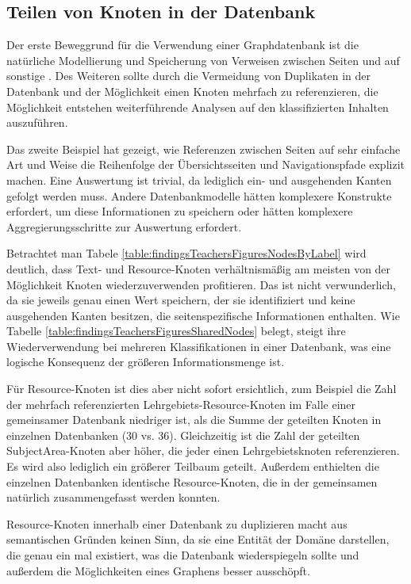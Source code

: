 \subsection{Teilen von Knoten in der Datenbank}
    Der erste Beweggrund für die Verwendung einer Graphdatenbank
    ist die natürliche Modellierung und Speicherung von Verweisen
    zwischen Seiten und auf sonstige {\resources}.
    Des Weiteren sollte durch die Vermeidung von Duplikaten in der Datenbank
    und der Möglichkeit einen Knoten mehrfach zu referenzieren,
    die Möglichkeit entstehen weiterführende Analysen auf den klassifizierten
    Inhalten auszuführen.

    Das zweite Beispiel hat gezeigt,
    wie Referenzen zwischen Seiten auf sehr einfache Art und Weise
    die Reihenfolge der Übersichtsseiten und Navigationspfade explizit machen.
    Eine Auswertung ist trivial, da lediglich ein- und ausgehenden Kanten gefolgt werden muss.
    Andere Datenbankmodelle hätten komplexere Konstrukte erfordert,
    um diese Informationen zu speichern oder hätten komplexere
    Aggregierungsschritte zur Auswertung erfordert.

    Betrachtet man Tabele \ref{table:findingsTeachersFiguresNodesByLabel} wird deutlich,
    dass Text- und Resource-Knoten verhältnismäßig am meisten von der
    Möglichkeit Knoten wiederzuverwenden profitieren.
    Das ist nicht verwunderlich, da sie jeweils genau einen Wert speichern,
    der sie identifiziert und keine ausgehenden Kanten besitzen,
    die seitenspezifische Informationen enthalten.
    Wie Tabelle \ref{table:findingsTeachersFiguresSharedNodes} belegt,
    steigt ihre Wiederverwendung bei mehreren Klassifikationen in einer Datenbank,
    was eine logische Konsequenz der größeren Informationsmenge ist.

    Für Resource-Knoten ist dies aber nicht sofort ersichtlich,
    zum Beispiel die Zahl der mehrfach referenzierten
    Lehrgebiets-Resource-Knoten im Falle einer gemeinsamer Datenbank niedriger ist,
    als die Summe der geteilten Knoten in einzelnen Datenbanken (30 vs. 36).
    Gleichzeitig ist die Zahl der geteilten SubjectArea-Knoten aber höher,
    die jeder einen Lehrgebietsknoten referenzieren.
    Es wird also lediglich ein größerer Teilbaum geteilt.
    Außerdem enthielten die einzelnen Datenbanken identische Resource-Knoten,
    die in der gemeinsamen natürlich zusammengefasst werden konnten.

    Resource-Knoten innerhalb einer Datenbank zu duplizieren
    macht aus semantischen Gründen keinen Sinn,
    da sie eine Entität der Domäne darstellen,
    die genau ein mal existiert, was die Datenbank wiederspiegeln sollte
    und außerdem die Möglichkeiten eines Graphens besser ausschöpft.

